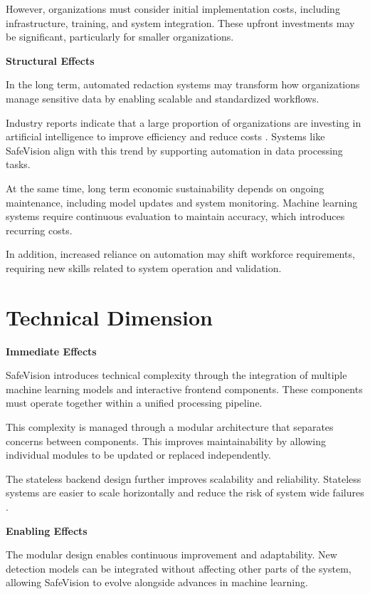 However, organizations must consider initial implementation costs, including infrastructure, training, and system integration. These upfront investments may be significant, particularly for smaller organizations.

\noindent\textbf{Structural Effects}

In the long term, automated redaction systems may transform how organizations manage sensitive data by enabling scalable and standardized workflows.

Industry reports indicate that a large proportion of organizations are investing in artificial intelligence to improve efficiency and reduce costs \cite{mckinsey2021ai}. Systems like SafeVision align with this trend by supporting automation in data processing tasks.

At the same time, long term economic sustainability depends on ongoing maintenance, including model updates and system monitoring. Machine learning systems require continuous evaluation to maintain accuracy, which introduces recurring costs.

In addition, increased reliance on automation may shift workforce requirements, requiring new skills related to system operation and validation.


\section{Technical Dimension}

\noindent\textbf{Immediate Effects}

SafeVision introduces technical complexity through the integration of multiple machine learning models and interactive frontend components. These components must operate together within a unified processing pipeline.

This complexity is managed through a modular architecture that separates concerns between components. This improves maintainability by allowing individual modules to be updated or replaced independently.

The stateless backend design further improves scalability and reliability. Stateless systems are easier to scale horizontally and reduce the risk of system wide failures \cite{fielding2000rest}.

\noindent\textbf{Enabling Effects}

The modular design enables continuous improvement and adaptability. New detection models can be integrated without affecting other parts of the system, allowing SafeVision to evolve alongside advances in machine learning.


